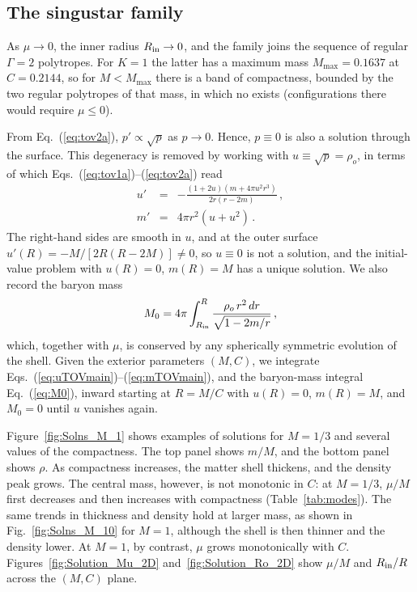 \documentclass[%
 reprint,
 amsmath,amssymb,
 aps,prd,
 superscriptaddress,
]{revtex4-2}
\begin{document}
\subsection{The singustar family}

 As $\mu\to0$, the inner radius $R_{\rm in} \rightarrow 0$, and the family joins the sequence of regular $\Gamma=2$ polytropes. For $K=1$ the latter has a maximum mass $M_{\max}=0.1637$ at $C=0.2144$, so for $M<M_{\max}$ there is a band of compactness, bounded by the two regular polytropes of that mass, in which no \singu{} exists (configurations there would require $\mu\le0$).

From Eq.~(\ref{eq:tov2a}), $p'\propto\sqrt{p}$ as $p\to0$. Hence, $p\equiv0$ is also a solution through the surface. This degeneracy is removed by working with $u\equiv\sqrt{p}=\rho_o$, in terms of which Eqs.~(\ref{eq:tov1a})--(\ref{eq:tov2a}) read
\begin{eqnarray}
u' &=& -\frac{(1+2u)(m+4\pi u^2r^3)}{2r(r-2m)}\,,\label{eq:uTOVmain}\\
m' &=& 4\pi r^2(u+u^2)\,.\label{eq:mTOVmain}
\end{eqnarray}
The right-hand sides are smooth in $u$, and at the outer surface $u'(R)=-M/[2R(R-2M)]\neq0$, so $u\equiv0$ is not a solution, and the initial-value problem with $u(R)=0$, $m(R)=M$ has a unique solution. 
We also record the baryon mass
\begin{equation}
M_0 = 4\pi\int_{R_{\rm in}}^{R} \frac{\rho_o\,r^2\,dr}{\sqrt{1-2m/r}}\,,
\label{eq:M0}
\end{equation}
which, together with $\mu$, is conserved by any spherically symmetric evolution of the shell.
Given the exterior parameters $(M,C)$, we integrate Eqs.~(\ref{eq:uTOVmain})--(\ref{eq:mTOVmain}), and the baryon-mass integral Eq.~(\ref{eq:M0}), inward starting at $R = M/C$ with $u(R)=0$, $m(R)=M$, and $M_0=0$ until $u$ vanishes again. 

Figure~\ref{fig:Solns_M_1} shows examples of \singu{} solutions for $M=1/3$ and several values of the compactness. The top panel shows $m/M$, and the bottom panel shows $\rho$. As compactness increases, the matter shell thickens, and the density peak grows. The central mass, however, is not monotonic in $C$: at $M=1/3$, $\mu/M$ first decreases and then increases with compactness (Table~\ref{tab:modes}). The same trends in thickness and density hold at larger mass, as shown in Fig.~\ref{fig:Solns_M_10} for $M=1$, although the shell is then thinner and the density lower. At $M=1$, by contrast, $\mu$ grows monotonically with $C$. Figures~\ref{fig:Solution_Mu_2D} and~\ref{fig:Solution_Ro_2D} show $\mu/M$ and $R_{\rm in}/R$ across the $(M,C)$ plane.
\end{document}

